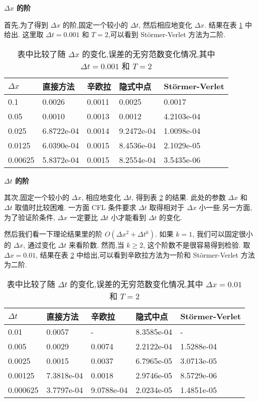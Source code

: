 \textbf{$\Delta x$ 的阶}

首先,为了得到 $\Delta x$ 的阶,固定一个较小的 $\Delta t$, 然后相应地变化 $\Delta x$. 结果在表 \ref{tab:dx1} 中给出. 这里取 $\Delta t=0.001$ 和 $T=2$,可以看到 St\"{o}rmer-Verlet 方法为二阶.

\begin{table}[h]
  \centering
\caption{表中比较了随 $\Delta x$ 的变化,误差的无穷范数变化情况,其中 $\Delta t=0.001$ 和 $T=2$}
\begin{tabularx}{\linewidth}{XXXXX}
 \toprule[1.5pt]
 $\Delta x$ &直接方法 & 辛欧拉 & 隐式中点 & St\"{o}rmer-Verlet\\
 \midrule[1pt]
 0.1 & 0.0026 & 0.0011 & 0.0025 & 0.0017\\
 0.05 & 0.0010 & 0.0013 & 0.0012 & 4.2103e-04\\
 0.025 & 6.8722e-04 & 0.0014 & 9.2472e-04 & 1.0098e-04\\
 0.0125 & 6.0390e-04 & 0.0015 & 8.4536e-04 & 2.1029e-05\\
 0.00625 & 5.8372e-04 & 0.0015 & 8.2554e-04 & 3.5435e-06\\
 \bottomrule[1.5pt]
\end{tabularx}
  \label{tab:dx1}
\end{table}

\textbf{$\Delta t$ 的阶}

其次,固定一个较小的 $\Delta x$, 相应地变化 $\Delta t$, 得到表 \ref{tab:dt1} 的结果. 此处的参数 $\Delta x$ 和 $\Delta t$ 取值时比较困难. 一方面 CFL 条件要求 $\Delta t$ 取得相对于 $\Delta x$ 小一些.另一方面,为了验证阶条件, $\Delta x$ 一定要比 $\Delta t$ 小才能看到 $\Delta t$ 的变化.

然后我们看一下理论结果里的阶 $O(\Delta x^2+ \Delta t^k)$. 如果 $k =
1$, 我们可以固定很小的 $\Delta x$, 通过变化 $\Delta t$ 来看阶数. 然而,当 $k \ge 2$, 这个阶数不是很容易得到检验. 取 $\Delta x = 0.01$, 结果在表 \ref{tab:dt1} 中给出,可以看到辛欧拉方法为一阶和 St\"{o}rmer-Verlet 方法为二阶.

\begin{table}[h]
  \centering
\caption{表中比较了随 $\Delta t$ 的变化,误差的无穷范数变化情况,其中 $\Delta x=0.01$ 和 $T=2$}
\begin{tabularx}{\linewidth}{XXXXX}
 \toprule[1.5pt]
 $\Delta t$ &直接方法 & 辛欧拉 & 隐式中点 & St\"{o}rmer-Verlet\\
 \midrule[1pt]
 0.01 & 0.0057 & - & 8.3585e-04 & - \\
 0.005 & 0.0029 & 0.0074 & 2.2122e-04 & 1.5288e-04 \\
 0.0025 & 0.0015 & 0.0037 & 6.7965e-05 & 3.0713e-05 \\
 0.00125 & 7.3818e-04 & 0.0018 & 2.9746e-05 & 8.5729e-06 \\
 0.000625 & 3.7797e-04 & 9.0788e-04 & 2.0234e-05 & 1.4851e-05 \\
 \bottomrule[1.5pt]
\end{tabularx}
  \label{tab:dt1}
\end{table}

